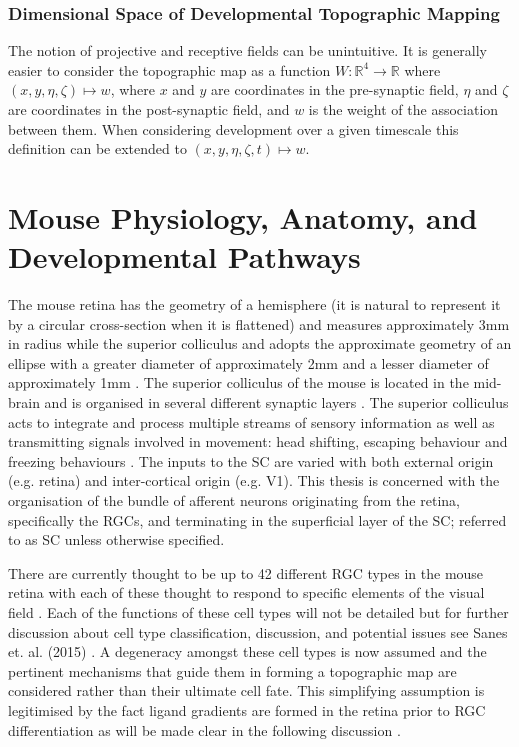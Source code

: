 \subsubsection{Dimensional Space of Developmental Topographic Mapping \label{sec:dimensionspace}}
The notion of projective and receptive fields can be unintuitive. It is generally easier to consider the topographic map as a function $W: \mathbb{R}^4 \rightarrow \mathbb{R}$ where $(x, y, \eta, \zeta) \mapsto w$, where $x$ and $y$ are coordinates in the pre-synaptic field, $\eta$ and $\zeta$ are coordinates in the post-synaptic field, and $w$ is the weight of the association between them. When considering development over a given timescale this definition can be extended to $(x, y, \eta, \zeta, t) \mapsto w$.
\section{Mouse Physiology, Anatomy, and Developmental Pathways}
The mouse retina has the geometry of a hemisphere (it is natural to represent it by a circular cross-section when it is flattened) and measures approximately 3mm in radius while the superior colliculus and adopts the approximate geometry of an ellipse with a greater diameter of approximately 2mm and a lesser diameter of approximately 1mm \cite{Park2012-yn, Seabrook2017-fa}. The superior colliculus of the mouse is located in the mid-brain and is organised in several different synaptic layers \cite{Ito2018-ef}. The superior colliculus acts to integrate and process multiple streams of sensory information as well as transmitting signals involved in movement: head shifting, escaping behaviour and freezing behaviours \cite{Ito2018-ef}. The inputs to the SC are varied with both external origin (e.g. retina) and inter-cortical origin (e.g. V1). This thesis is concerned with the organisation of the bundle of afferent neurons originating from the retina, specifically the RGCs, and terminating in the superficial layer of the SC; referred to as SC unless otherwise specified.
	
There are currently thought to be up to 42 different RGC types in the mouse retina with each of these thought to respond to specific elements of the visual field \cite{Goetz2022-ew, Baden2016-kx}. Each of the functions of these cell types will not be detailed but for further discussion about cell type classification, discussion, and potential issues see Sanes et. al. (2015) \cite{Sanes2015-xq}. A degeneracy amongst these cell types is now assumed and the pertinent mechanisms that guide them in forming a topographic map are considered rather than their ultimate cell fate. This simplifying assumption is legitimised by the fact ligand gradients are formed in the retina prior to RGC differentiation as will be made clear in the following discussion \cite{Marcus1996-kh}.


